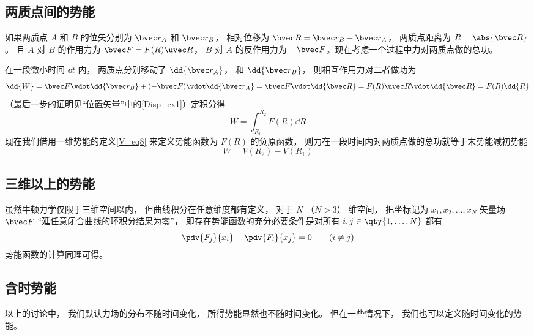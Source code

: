 \subsection{两质点间的势能}

如果两质点 $A$ 和 $B$ 的位矢分别为 $\bvec r_A$ 和 $\bvec r_B$， 相对位移为 $\bvec R = \bvec r_B - \bvec r_A$， 两质点距离为 $R = \abs{\bvec R}$。 且 $A$ 对 $B$ 的作用力为 $\bvec F = F(R) \uvec R$， $B$ 对 $A$ 的反作用力为 $-\bvec F$。现在考虑一个过程中力对两质点做的总功。

在一段微小时间 $\dd{t}$ 内， 两质点分别移动了 $\dd{\bvec r_A}$， 和 $\dd{\bvec r_B}$， 则相互作用力对二者做功为
\begin{equation}
\dd{W} = \bvec F \vdot \dd{\bvec r_B} + (- \bvec F) \vdot \dd{\bvec r_A} = \bvec F \vdot \dd{\bvec R}
= F(R)\uvec R\vdot \dd{\bvec R} = F(R) \dd{R}
\end{equation}
（最后一步的证明见“位置矢量”中的\autoref{Disp_ex1}）定积分得
\begin{equation}
W = \int_{R_1}^{R_2}  F(R) \dd{R}
\end{equation}
现在我们借用一维势能的定义\autoref{V_eq8} 来定义势能函数为 $F(R)$ 的负原函数， 则力在一段时间内对两质点做的总功就等于末势能减初势能
\begin{equation}\label{V_eq20}
W = V(R_2) - V(R_1)
\end{equation}

\subsection{三维以上的势能}
虽然牛顿力学仅限于三维空间以内， 但曲线积分在任意维度都有定义， 对于 $N$ （$N > 3$） 维空间， 把坐标记为 $x_1, x_2, \dots, x_N$ 矢量场 $\bvec F$ “延任意闭合曲线的环积分结果为零”， 即存在势能函数的充分必要条件是对所有 $i,j \in \qty{1,\dots, N}$ 都有
\begin{equation}
\pdv{F_j}{x_i} - \pdv{F_i}{x_j} = 0 \qquad (i\ne j)
\end{equation}
势能函数的计算同理可得。

\subsection{含时势能}
以上的讨论中， 我们默认力场的分布不随时间变化， 所得势能显然也不随时间变化。 但在一些情况下， 我们也可以定义随时间变化的势能。




